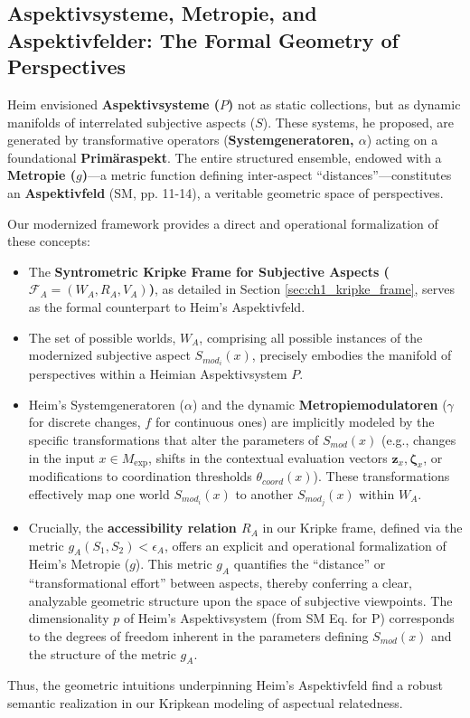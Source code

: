 \documentclass[
    12pt,              %
    a4paper,           %
    headings=normal,   %
    twoside=true,      %
    BCOR=8mm,          %
]{scrbook}
\newcommand{\q}[1]{\enquote{#1}}
\newcommand{\aspektivsystem}{P}
\newcommand{\subjektiveraspekt}{S}
\newcommand{\Mexp}{M_{\text{exp}}}
\begin{document}
\subsection{Aspektivsysteme, Metropie, and Aspektivfelder: The Formal Geometry of Perspectives}
\label{sec:ch1_revisit_aspektivsysteme} 

Heim envisioned \textbf{Aspektivsysteme (\(\aspektivsystem\))} not as static collections, but as dynamic manifolds of interrelated subjective aspects (\(\subjektiveraspekt\)). These systems, he proposed, are generated by transformative operators (\textbf{Systemgeneratoren, \(\alpha\)}) acting on a foundational \textbf{Primäraspekt}. The entire structured ensemble, endowed with a \textbf{Metropie (\(g\))}—a metric function defining inter-aspect \q{distances}—constitutes an \textbf{Aspektivfeld} (SM, pp. 11-14), a veritable geometric space of perspectives.

Our modernized framework provides a direct and operational formalization of these concepts:
\begin{itemize}
    \item   The \textbf{Syntrometric Kripke Frame for Subjective Aspects (\(\mathcal{F}_A = (W_A, R_A, V_A)\))}, as detailed in Section \ref{sec:ch1_kripke_frame}, serves as the formal counterpart to Heim's Aspektivfeld.
    \item   The set of possible worlds, \(W_A\), comprising all possible instances of the modernized subjective aspect \(S_{mod_i}(x)\), precisely embodies the manifold of perspectives within a Heimian Aspektivsystem \(\aspektivsystem\).
    \item   Heim’s Systemgeneratoren (\(\alpha\)) and the dynamic \textbf{Metropiemodulatoren} (\(\gamma\) for discrete changes, \(f\) for continuous ones) are implicitly modeled by the specific transformations that alter the parameters of \(S_{mod}(x)\) (e.g., changes in the input \(x \in \Mexp\), shifts in the contextual evaluation vectors \(\mathbf{z}_x, \mathbf{\zeta}_x\), or modifications to coordination thresholds \(\theta_{coord}(x)\)). These transformations effectively map one world \(S_{mod_i}(x)\) to another \(S_{mod_j}(x)\) within \(W_A\).
    \item   Crucially, the \textbf{accessibility relation \(R_A\)} in our Kripke frame, defined via the metric \(g_A(S_1, S_2) < \epsilon_A\), offers an explicit and operational formalization of Heim’s Metropie (\(g\)). This metric \(g_A\) quantifies the \q{distance} or \q{transformational effort} between aspects, thereby conferring a clear, analyzable geometric structure upon the space of subjective viewpoints. The dimensionality \(p\) of Heim’s Aspektivsystem (from SM Eq. for P) corresponds to the degrees of freedom inherent in the parameters defining \(S_{mod}(x)\) and the structure of the metric \(g_A\).
\end{itemize}
Thus, the geometric intuitions underpinning Heim's Aspektivfeld find a robust semantic realization in our Kripkean modeling of aspectual relatedness.
\end{document}
